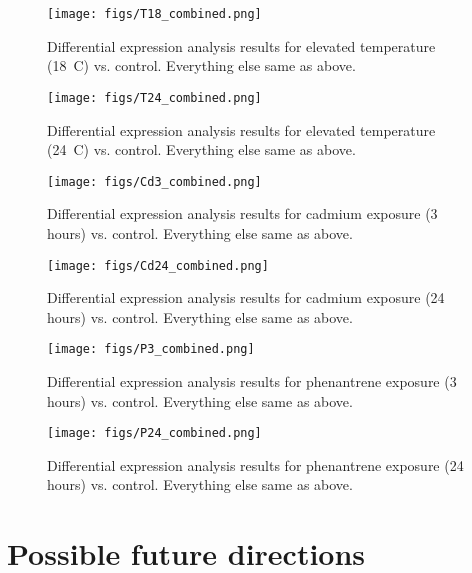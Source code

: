 \documentclass[12pt]{article}
\begin{document}
\begin{figure}[H]
\hskip -5mm \texttt{[image: figs/T18\_combined.png]}
\caption{Differential expression analysis results for elevated temperature (18~\textdegree C) vs. control. Everything else same as above.}
\label{t18_combined}
\end{figure}

\begin{figure}[H]
\hskip -5mm \texttt{[image: figs/T24\_combined.png]}
\caption{Differential expression analysis results for elevated temperature (24~\textdegree C) vs. control. Everything else same as above.}
\label{t24_combined}
\end{figure}

\begin{figure}[H]
\hskip -5mm \texttt{[image: figs/Cd3\_combined.png]}
\caption{Differential expression analysis results for cadmium exposure (3 hours) vs. control. Everything else same as above.}
\label{cd3_combined}
\end{figure}

\begin{figure}[H]
\hskip -5mm \texttt{[image: figs/Cd24\_combined.png]}
\caption{Differential expression analysis results for cadmium exposure (24 hours) vs. control. Everything else same as above.}
\label{cd24_combined}
\end{figure}


\begin{figure}[H]
\hskip -5mm \texttt{[image: figs/P3\_combined.png]}
\caption{Differential expression analysis results for phenantrene exposure (3 hours) vs. control. Everything else same as above.}
\label{p3_combined}
\end{figure}


\begin{figure}[H]
\hskip -5mm \texttt{[image: figs/P24\_combined.png]}
\caption{Differential expression analysis results for phenantrene exposure (24 hours) vs. control. Everything else same as above.}
\label{p24_combined}
\end{figure}


\section{Possible future directions}
\end{document}

